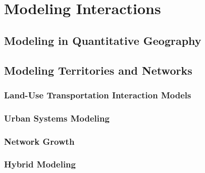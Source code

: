 \section{Modeling Interactions}


\subsection{Modeling in Quantitative Geography}





\subsection{Modeling Territories and Networks}


\subsubsection{Land-Use Transportation Interaction Models}

\cite{chang2006models}

\cite{delons:hal-00319087}

\cite{iacono2008models}

\cite{kryvobokov2013comparison}

\cite{paulley1991overview}

\cite{putman1975urban}

\cite{wegener1991one}

\cite{wegener2004land}


\subsubsection{Urban Systems Modeling}



\subsubsection{Network Growth}



\subsubsection{Hybrid Modeling}


